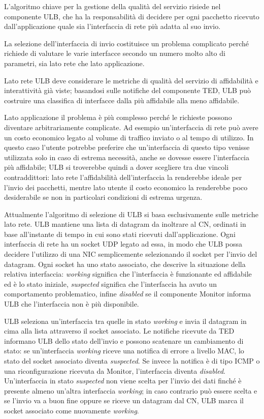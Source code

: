 \documentclass[12pt,a4paper,openright,twoside]{book}
\begin{document}
L'algoritmo chiave per la gestione della qualità del servizio risiede
nel componente ULB, che ha la responsabilità di decidere per ogni
pacchetto ricevuto dall'applicazione quale sia l'interfaccia di rete
più adatta al suo invio.

La selezione dell'interfaccia di invio costituisce un problema
complicato perché richiede di valutare le varie interfacce secondo un
numero molto alto di parametri, sia lato rete che lato applicazione.

Lato rete ULB deve considerare le metriche di qualità del servizio di
affidabilità e interattività già viste; basandosi sulle notifiche del
componente TED, ULB può costruire una classifica di interfacce dalla
più affidabile alla meno affidabile.

Lato applicazione il problema è più complesso perché le richieste
possono diventare arbitrariamente complicate. Ad esempio
un'interfaccia di rete può avere un costo economico legato al volume
di traffico inviato o al tempo di utilizzo. In questo caso l'utente
potrebbe preferire che un'interfaccia di questo tipo venisse
utilizzata solo in caso di estrema necessità, anche se dovesse essere
l'interfaccia più affidabile; ULB si troverebbe quindi a dover
scegliere tra due vincoli contraddittori: lato rete l'affidabilità
dell'interfaccia la renderebbe ideale per l'invio dei pacchetti,
mentre lato utente il costo economico la renderebbe poco desiderabile
se non in particolari condizioni di estrema urgenza.

Attualmente l'algoritmo di selezione di ULB si basa esclusivamente
sulle metriche lato rete. ULB mantiene una lista di datagram da
inoltrare al CN, ordinati in base all'instante di tempo in cui sono
stati ricevuti dall'applicazione. Ogni interfaccia di rete ha un
socket UDP legato ad essa, in modo che ULB possa decidere l'utilizzo
di una NIC semplicemente selezionando il socket per l'invio del
datagram. Ogni socket ha uno stato associato, che descrive la
situazione della relativa interfaccia: \emph{working} significa che
l'interfaccia è funzionante ed affidabile ed è lo stato iniziale,
\emph{suspected} significa che l'interfaccia ha avuto un comportamento
problematico, infine \emph{disabled} se il componente Monitor informa
ULB che l'interfaccia non è più disponibile.

ULB seleziona un'interfaccia tra quelle in stato \emph{working} e
invia il datagram in cima alla lista attraverso il socket
associato. Le notifiche ricevute da TED informano ULB dello stato
dell'invio e possono scatenare un cambiamento di stato: se
un'interfaccia \emph{working} riceve una notifica di errore a livello
MAC, lo stato del socket associato diventa \emph{suspected}. Se invece
la notifica è di tipo ICMP o una riconfigurazione ricevuta da Monitor,
l'interfaccia diventa \emph{disabled}. Un'interfaccia in stato
\emph{suspected} non viene scelta per l'invio dei dati finché è
presente almeno un'altra interfaccia \emph{working}; in caso contrario
può essere scelta e se l'invio va a buon fine oppure se riceve un
datagram dal CN, ULB marca il socket associato come nuovamente
\emph{working}.
\end{document}
